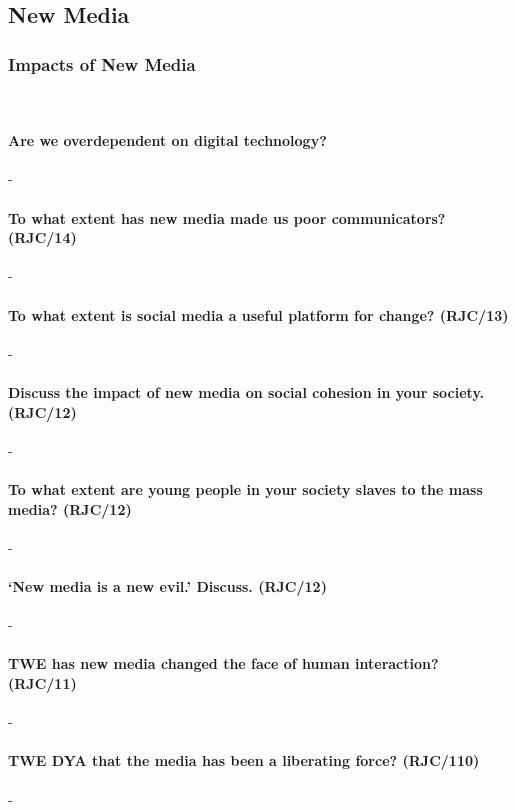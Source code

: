 \documentclass[../../main]{subfiles}
\begin{document}
\subsection{New Media}

\subsubsection{Impacts of New Media}\

\paragraph{Are we overdependent on digital technology?}-

\paragraph{To what extent has new media made us poor communicators? (RJC/14)}-

\paragraph{To what extent is social media a useful platform for change? (RJC/13)}-

\paragraph{Discuss the impact of new media on social cohesion in your society. (RJC/12)}-

\paragraph{To what extent are young people in your society slaves to the mass media? (RJC/12)}-

\paragraph{`New media is a new evil.' Discuss. (RJC/12)}-

\paragraph{TWE has new media changed the face of human interaction? (RJC/11)}-

\paragraph{TWE DYA that the media has been a liberating force? (RJC/110)}-
\end{document}
